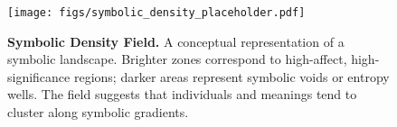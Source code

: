 \begin{figure}[H]
\centering
\texttt{[image: figs/symbolic\_density\_placeholder.pdf]}
\caption{\textbf{Symbolic Density Field.} A conceptual representation of a symbolic landscape. Brighter zones correspond to high-affect, high-significance regions; darker areas represent symbolic voids or entropy wells. The field suggests that individuals and meanings tend to cluster along symbolic gradients.}
\end{figure}
